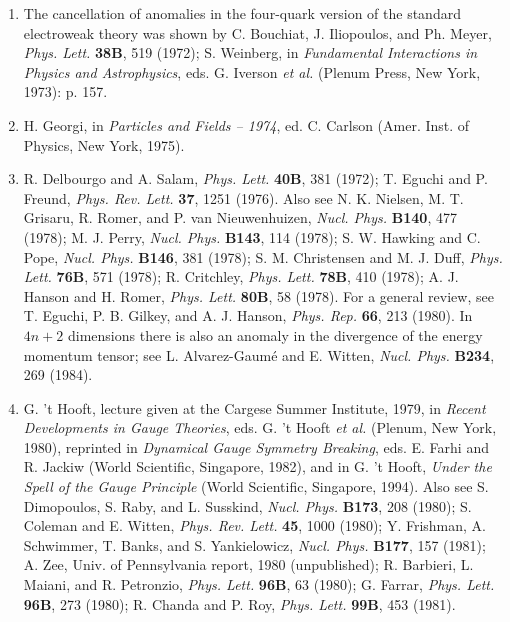 \begin{enumerate}
\item[13a.] \label{ch22-ref-13a}
The cancellation of anomalies in the four-quark version of the standard
electroweak theory was shown by C. Bouchiat, J. Iliopoulos, and Ph. Meyer,
\emph{Phys. Lett.} \textbf{38B}, 519 (1972); S. Weinberg, in
\emph{Fundamental Interactions in Physics and Astrophysics}, eds.
G. Iverson \emph{et al.} (Plenum Press, New York, 1973): p. 157.

\item {}\label{ch22-ref-14}
H. Georgi, in \emph{Particles and Fields -- 1974}, ed. C. Carlson
(Amer. Inst. of Physics, New York, 1975).

\item {}\label{ch22-ref-15}
R. Delbourgo and A. Salam, \emph{Phys. Lett.} \textbf{40B}, 381 (1972);
T. Eguchi and P. Freund, \emph{Phys. Rev. Lett.} \textbf{37}, 1251
(1976). Also see N. K. Nielsen, M. T. Grisaru, R. Romer, and
P. van Nieuwenhuizen, \emph{Nucl. Phys.} \textbf{B140}, 477 (1978);
M. J. Perry, \emph{Nucl. Phys.} \textbf{B143}, 114 (1978);
S. W. Hawking and C. Pope, \emph{Nucl. Phys.} \textbf{B146}, 381 (1978);
S. M. Christensen and M. J. Duff, \emph{Phys. Lett.} \textbf{76B}, 571
(1978); R. Critchley, \emph{Phys. Lett.} \textbf{78B}, 410 (1978);
A. J. Hanson and H. Romer, \emph{Phys. Lett.} \textbf{80B}, 58 (1978).
For a general review, see T. Eguchi, P. B. Gilkey, and A. J. Hanson,
\emph{Phys. Rep.} \textbf{66}, 213 (1980). In $4n+2$ dimensions there is
also an anomaly in the divergence of the energy momentum tensor; see
L. Alvarez-Gaum\'e and E. Witten, \emph{Nucl. Phys.} \textbf{B234}, 269
(1984).

\item {}\label{ch22-ref-16}
G. 't Hooft, lecture given at the Cargese Summer Institute, 1979, in
\emph{Recent Developments in Gauge Theories}, eds. G. 't Hooft
\emph{et al.} (Plenum, New York, 1980), reprinted in
\emph{Dynamical Gauge Symmetry Breaking}, eds. E. Farhi and R. Jackiw
(World Scientific, Singapore, 1982), and in G. 't Hooft,
\emph{Under the Spell of the Gauge Principle} (World Scientific,
Singapore, 1994). Also see S. Dimopoulos, S. Raby, and L. Susskind,
\emph{Nucl. Phys.} \textbf{B173}, 208 (1980); S. Coleman and
E. Witten, \emph{Phys. Rev. Lett.} \textbf{45}, 1000 (1980);
Y. Frishman, A. Schwimmer, T. Banks, and S. Yankielowicz,
\emph{Nucl. Phys.} \textbf{B177}, 157 (1981); A. Zee, Univ. of
Pennsylvania report, 1980 (unpublished); R. Barbieri, L. Maiani, and
R. Petronzio, \emph{Phys. Lett.} \textbf{96B}, 63 (1980); G. Farrar,
\emph{Phys. Lett.} \textbf{96B}, 273 (1980); R. Chanda and P. Roy,
\emph{Phys. Lett.} \textbf{99B}, 453 (1981).


\end{enumerate}
